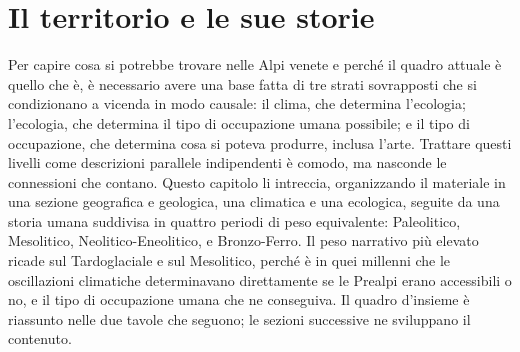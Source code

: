 \chapter{Il territorio e le sue storie}
\label{cap:storia_territorio}

Per capire cosa si potrebbe trovare nelle Alpi venete e perché il quadro attuale è quello che è, è necessario avere una base fatta di tre strati sovrapposti che si condizionano a vicenda in modo causale: il clima, che determina l'ecologia; l'ecologia, che determina il tipo di occupazione umana possibile; e il tipo di occupazione, che determina cosa si poteva produrre, inclusa l'arte. Trattare questi livelli come descrizioni parallele indipendenti è comodo, ma nasconde le connessioni che contano. Questo capitolo li intreccia, organizzando il materiale in una sezione geografica e geologica, una climatica e una ecologica, seguite da una storia umana suddivisa in quattro periodi di peso equivalente: Paleolitico, Mesolitico, Neolitico-Eneolitico, e Bronzo-Ferro. Il peso narrativo più elevato ricade sul Tardoglaciale e sul Mesolitico, perché è in quei millenni che le oscillazioni climatiche determinavano direttamente se le Prealpi erano accessibili o no, e il tipo di occupazione umana che ne conseguiva. Il quadro d'insieme è riassunto nelle due tavole che seguono; le sezioni successive ne sviluppano il contenuto.

